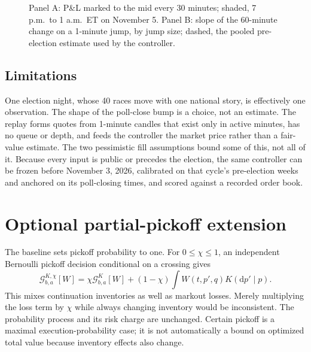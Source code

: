 \documentclass[11pt]{article}
\newcommand{\1}{\mathbf 1}
\newcommand{\dd}{\mathrm d}
\newcommand{\G}{\mathcal G}
\begin{document}
\begin{figure}[htbp]
\caption{Panel A: P\&L marked to the mid every 30 minutes; shaded, 7 p.m.\ to 1 a.m.\ ET on
November 5. Panel B: slope of the 60-minute change on a 1-minute jump, by jump size;
dashed, the pooled pre-election estimate used by the controller.}
\label{fig:election}
\end{figure}

\subsection{Limitations}
One election night, whose 40 races move with one national story, is effectively one
observation. The shape of the poll-close bump is a choice, not an estimate. The
replay forms quotes from 1-minute candles that exist only in active minutes, has no
queue or depth, and feeds the controller the market price rather than a fair-value
estimate. The two pessimistic fill assumptions bound some of this, not all of it.
Because every input is public or precedes the election, the same controller can be
frozen before November 3, 2026, calibrated on that cycle's pre-election weeks and
anchored on its poll-closing times, and scored against a recorded order book.

\clearpage
\appendix
\section{Optional partial-pickoff extension}
The baseline sets pickoff probability to one. For $0\le\chi\le1$, an independent
Bernoulli pickoff decision conditional on a crossing gives
\begin{equation}
 \G^{K,\chi}_{b,a}[W]
 =\chi\G^K_{b,a}[W]+(1-\chi)\int W(t,p',q)K(\dd p'\mid p).
\end{equation}
This mixes continuation inventories as well as markout losses. Merely
multiplying the loss term by $\chi$ while always changing inventory would be
inconsistent. The probability process and its risk charge are unchanged.
Certain pickoff is a maximal execution-probability case; it is not automatically
a bound on optimized total value because inventory effects also change.
\end{document}
